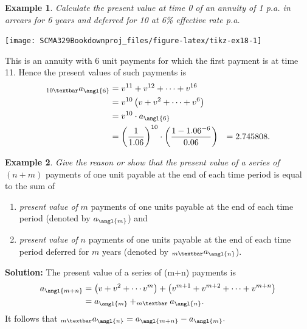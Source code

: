\documentclass[
]{book}
\theoremstyle{definition}
\theoremstyle{definition}
\newtheorem{example}{Example}[chapter]
\theoremstyle{definition}
\theoremstyle{definition}
\theoremstyle{remark}
\begin{document}
\begin{example}
\emph{Calculate the present value at time 0 of an annuity of 1 p.a. in
arrears for 6 years and deferred for 10 at 6\% effective rate p.a.}
\end{example}

\begin{center}\texttt{[image: SCMA329Bookdownproj\_files/figure-latex/tikz-ex18-1]} \end{center}

This is an annuity with 6 unit payments for which the first payment is
at time 11. Hence the present values of such payments is
\[\begin{aligned}
    _{10 \textbar}a_\angl{6}
  &= v^{11} + v^{12} + \cdots +v^{16}  \\
    &= v^{10}  \left( v + v^2 + \cdots + v^6  \right) \\
    &= v^{10} \cdot  a_\angl{6} \\
    &= \left(\frac{1}{1.06}\right)^{10} \cdot \left( \frac{1- 1.06^{-6}}{0.06} \right)
    &= 2.745808.\end{aligned}\]

\begin{example}

\emph{Give the reason or show that the present value of a series of} \((n+m)\)
payments of one unit payable at the end of each time period is equal to
the sum of

\begin{enumerate}
\def\labelenumi{\arabic{enumi}.}
\item
  \emph{present value of} \(m\) payments of one units payable at the end of
  each time period (denoted by \(a_\angl{m}\)) and
\item
  \emph{present value of} \(n\) payments of one units payable at the end of
  each time period deferred for \(m\) years (denoted by
  \(_{m \textbar}a_\angl{n}\)).
\end{enumerate}

\end{example}

\textbf{Solution:} The present value of a series of (m+n) payments is
\[\begin{aligned}
a_\angl{m+n} &=  \left( v + v^2 + \cdots  v^m\right) + \left( v^{m+1} + v^{m+2} + \cdots +v^{m+n} \right) \\
&= a_\angl{m} + _{m \textbar}a_\angl{n}.\end{aligned}\] It follows that
\(_{m \textbar}a_\angl{n} = a_\angl{m+n} - a_\angl{m}.\)
\end{document}
